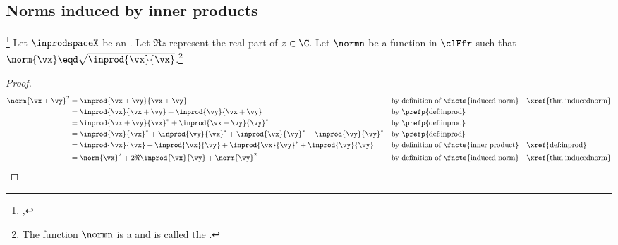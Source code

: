 \subsection{Norms induced by inner products}
\begin{lemma}
\footnote{
  ,
  }
\label{lem:||x+y||}
\label{lem:polarid}
Let $\inprodspaceX$ be an  .
Let $\Re z$ represent the real part of $z\in\C$.
Let $\normn$ be a function in $\clFfr$ such that $\norm{\vx}\eqd\sqrt{\inprod{\vx}{\vx}}$.\footnote{
The function $\normn$ is a   and is called the 
.}
\end{lemma}
\begin{proof}
\begin{align*}
   \norm{\vx+\vy}^2
     &= \inprod{\vx+\vy}{\vx+\vy}
     && \text{by definition of \fncte{induced norm}}
     && \text{\xref{thm:inducednorm}}
   \\&= \inprod{\vx}{\vx+\vy} + \inprod{\vy}{\vx+\vy}
     && \text{by \prefp{def:inprod}}
   \\&= \inprod{\vx+\vy}{\vx}^\ast + \inprod{\vx+\vy}{\vy}^\ast
     && \text{by \prefp{def:inprod}}
   \\&= \inprod{\vx}{\vx}^\ast + \inprod{\vy}{\vx}^\ast + \inprod{\vx}{\vy}^\ast + \inprod{\vy}{\vy}^\ast
     && \text{by \prefp{def:inprod}}
   \\&= \inprod{\vx}{\vx} + \inprod{\vx}{\vy} + \inprod{\vx}{\vy}^\ast + \inprod{\vy}{\vy}
     && \text{by definition of \fncte{inner product}}
     && \text{\xref{def:inprod}}
   \\&= \norm{\vx}^2 + 2\Re\inprod{\vx}{\vy} + \norm{\vy}^2
     && \text{by definition of \fncte{induced norm}}
     && \text{\xref{thm:inducednorm}}
\end{align*}
\end{proof}



